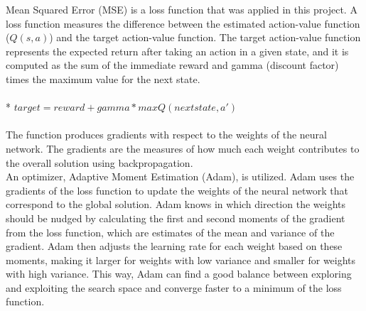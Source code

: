 \documentclass[letterpaper]{article} %
\begin{document}
Mean Squared Error (MSE) is a loss function that was applied in this project.
A loss function measures the difference between the estimated action-value function ($Q(s, a)$) and the target action-value function.
The target action-value function represents the expected return after taking an action in a given state, and it is computed as the sum of the immediate reward and gamma (discount factor) times the maximum value for the next state.
\\
\\*
$target = reward + gamma * maxQ(next state, a')$\\
\\
The function produces gradients with respect to the weights of the neural network.
The gradients are the measures of how much each weight contributes to the overall solution using backpropagation.\\

An optimizer, Adaptive Moment Estimation (Adam), is utilized.
Adam uses the gradients of the loss function to update the weights of the neural network that correspond to the global solution.
Adam knows in which direction the weights should be nudged by calculating the first and second moments of the gradient from the loss function, which are estimates of the mean and variance of the gradient.
Adam then adjusts the learning rate for each weight based on these moments, making it larger for weights with low variance and smaller for weights with high variance.
This way, Adam can find a good balance between exploring and exploiting the search space and converge faster to a minimum of the loss function.
\end{document}
